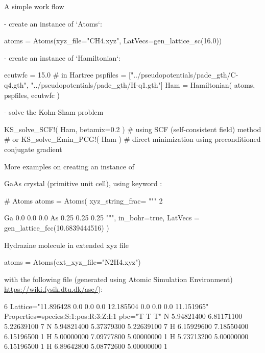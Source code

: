 A simple work flow

- create an instance of `Atoms`:

\begin{juliacode}
atoms = Atoms(xyz_file="CH4.xyz", LatVecs=gen_lattice_sc(16.0))
\end{juliacode}

- create an instance of `Hamiltonian`:

\begin{juliacode}
ecutwfc = 15.0 # in Hartree
pspfiles = ["../pseudopotentials/pade_gth/C-q4.gth",
            "../pseudopotentials/pade_gth/H-q1.gth"]
Ham = Hamiltonian( atoms, pspfiles, ecutwfc )
\end{juliacode}

- solve the Kohn-Sham problem

\begin{juliacode}
KS_solve_SCF!( Ham, betamix=0.2 )  # using SCF (self-consistent field) method
# or
KS_solve_Emin_PCG!( Ham ) # direct minimization using preconditioned conjugate gradient
\end{juliacode}

More examples on creating an instance of 

GaAs crystal (primitive unit cell), using keyword :
\begin{juliacode}
# Atoms
atoms = Atoms( xyz_string_frac=
    """
    2

    Ga  0.0   0.0   0.0
    As  0.25  0.25  0.25
    """,
    in_bohr=true,
    LatVecs = gen_lattice_fcc(10.6839444516)
)
\end{juliacode}


Hydrazine molecule in extended xyz file
\begin{juliacode}
atoms = Atoms(ext_xyz_file="N2H4.xyz")
\end{juliacode}

with the following  file (generated using Atomic Simulation
Environment) {\footnotesize \url{https://wiki.fysik.dtu.dk/ase/}}):

\begin{textcode}
6
Lattice="11.896428 0.0 0.0 0.0 12.185504 0.0 0.0 0.0 11.151965" Properties=species:S:1:pos:R:3:Z:I:1 pbc="T T T"
N       5.94821400       6.81171100       5.22639100        7 
N       5.94821400       5.37379300       5.22639100        7 
H       6.15929600       7.18550400       6.15196500        1 
H       5.00000000       7.09777800       5.00000000        1 
H       5.73713200       5.00000000       6.15196500        1 
H       6.89642800       5.08772600       5.00000000        1 
\end{textcode}

